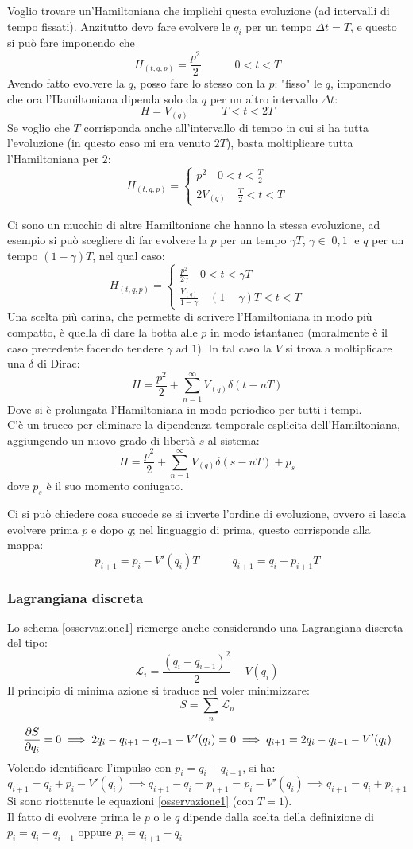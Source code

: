 \documentclass[a4paper,12pt]{article}
\renewcommand{\arg}[1]{_{(#1)}}
\theoremstyle{plain}
\theoremstyle{definition}
\newcommand{\f}[2]{\frac{#1}{#2}}
\theoremstyle{remark}
\begin{document}
Voglio trovare un'Hamiltoniana che implichi questa evoluzione (ad intervalli di tempo fissati). Anzitutto devo fare evolvere le $q_i$ per un tempo $\Delta t=T$, e questo si può fare imponendo che \[H\arg{t,q,p}=\f{p^2}{2}\quad\quad\quad 0<t<T
\]
Avendo fatto evolvere la $q$, posso fare lo stesso con la $p$: "fisso" le $q$, imponendo che ora l'Hamiltoniana dipenda solo da $q$ per un altro intervallo $\Delta t$:
\[H=V\arg{q}\quad\quad\quad T <t< 2T	\]
Se voglio che  $T$ corrisponda anche all'intervallo di tempo in cui si ha tutta l'evoluzione (in questo caso mi era venuto $2T$), basta moltiplicare tutta l'Hamiltoniana per $2$:
\[H\arg{t,q,p}=\begin{cases}
p^2 \quad0<t<\f{T}{2}\\
2V\arg{q}\quad \f{T}{2}<t<T
\end{cases}\]
\begin{obs}
	Ci sono un mucchio di altre Hamiltoniane che hanno la stessa evoluzione, ad esempio si può scegliere di far evolvere la $p$ per un tempo $\gamma T$, $\gamma\in [0,1[$ e $q$ per un tempo $(1-\gamma)T$, nel qual caso:
	\[H\arg{t,q,p}=\begin{cases}
	\f{p^2}{2\gamma} \quad0<t<\gamma T\\
\f{	V\arg{q}}{1-\gamma}\quad (1-\gamma)T<t<T\end{cases}\]
Una scelta più carina, che permette di scrivere l'Hamiltoniana in modo più compatto, è quella di dare la botta alle $p$ in modo istantaneo (moralmente è il caso precedente facendo tendere $\gamma$ ad $1$). In tal caso la $V$ si trova a moltiplicare una $\delta$ di Dirac:
\[H=\f{p^2}{2}+\sum_{n=1}^{\infty} V\arg{q}\delta(t-nT)\]
Dove si è prolungata l'Hamiltoniana in modo periodico per tutti i tempi.\\
C'è un trucco per eliminare la dipendenza temporale esplicita dell'Hamiltoniana, aggiungendo un nuovo grado di libertà $s$ al sistema:
\[H=\f{p^2}{2}+\sum_{n=1}^{\infty} V\arg{q}\delta(s-nT)+p_s\]
dove $p_s$ è il suo momento coniugato.
\end{obs}
\begin{obs}
	\label{osservazione1}
	Ci si può chiedere cosa succede se si inverte l'ordine di evoluzione, ovvero si lascia evolvere prima $p$ e dopo $q$; nel linguaggio di prima, questo corrisponde alla mappa:\[p_{i+1}=p_i-V'(q_i)T\quad\quad\quad q_{i+1}=q_i+p_{i+1}T		\]
\end{obs}
\subsubsection{Lagrangiana discreta}
Lo schema \ref{osservazione1} riemerge anche considerando una Lagrangiana discreta del tipo:
\[\mathscr{L}_i=\f{(q_i-q_{i-1})^2}{2}-V(q_i)\]
Il principio di minima azione si traduce nel voler minimizzare:
\[S=\sum_n \mathscr{L}_n\]
\[\pdv{S}{q_i}=0\implies 2q_i-q_{i+1}-q_{i-1}-V'(q_i)=0\implies q_{i+1}=2 q_i-q_{i-1}-V'(q_i)\]
Volendo identificare l'impulso con $p_i=q_i-q_{i-1}$, si ha:
\[q_{i+1}=q_i+p_i-V'(q_i)\implies	q_{i+1}-q_i=p_{i+1}=p_i-V'(q_i)	\implies q_{i+1}=q_i+p_{i+1}	\]
Si sono riottenute le equazioni \ref{osservazione1} (con $ T=1$).\\Il fatto di evolvere prima le $p$ o le $q$ dipende dalla scelta della definizione di $p_i=q_i-q_{i-1}$ oppure $p_i=q_{i+1}-q_i$
\end{document}
